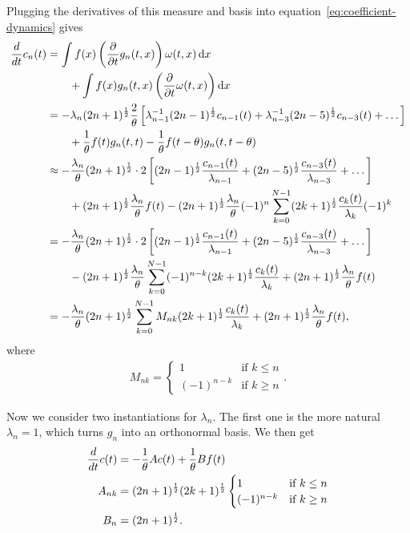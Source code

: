\documentclass[../../hippo]{subfiles}
\begin{document}
Plugging the derivatives of this measure and basis into equation~\eqref{eq:coefficient-dynamics} gives
\begin{align*}
  \frac{d}{dt} c_n(t)
  &= \int f(x) \left(\frac{\partial}{\partial t} g_n(t, x)\right) \omega(t, x) \mathop{}\!\mathrm{d} x
  \\
  &\qquad + \int f(x) g_n(t, x) \left(\frac{\partial}{\partial t} \omega(t, x)\right) \mathop{}\!\mathrm{d} x
  \\
  &= -\lambda_n (2n+1)^{\frac{1}{2}} \frac{2}{\theta} \left[ \lambda_{n-1}^{-1} (2n-1)^{\frac{1}{2}} c_{n-1}(t) + \lambda_{n-3}^{-1} (2n-5)^{\frac{1}{2}} c_{n-3}(t) + \dots \right]
  \\
  &\qquad + \frac{1}{\theta} f(t) g_n(t, t) - \frac{1}{\theta} f(t-\theta) g_n(t, t-\theta)
  \\
  &\approx -\frac{\lambda_n}{\theta} (2n+1)^{\frac{1}{2}} \cdot 2 \left[ (2n-1)^{\frac{1}{2}} \frac{c_{n-1}(t)}{\lambda_{n-1}} + (2n-5)^{\frac{1}{2}} \frac{c_{n-3}(t)}{\lambda_{n-3}} + \dots \right]
  \\
  &\qquad + (2n+1)^{\frac{1}{2}} \frac{\lambda_n}{\theta} f(t)
  - (2n+1)^{\frac{1}{2}} \frac{\lambda_n}{\theta} (-1)^n \sum_{k=0}^{N-1} (2k+1)^{\frac{1}{2}} \frac{c_k(t)}{\lambda_k} (-1)^{k}
  \\
  &= - \frac{\lambda_n}{\theta} (2n+1)^{\frac{1}{2}} \cdot 2 \left[ (2n-1)^{\frac{1}{2}} \frac{c_{n-1}(t)}{\lambda_{n-1}} + (2n-5)^{\frac{1}{2}} \frac{c_{n-3}(t)}{\lambda_{n-3}} + \dots \right]
  \\
  &\qquad - (2n+1)^{\frac{1}{2}} \frac{\lambda_n}{\theta} \sum_{k=0}^{N-1}  (-1)^{n-k} (2k+1)^{\frac{1}{2}} \frac{c_k(t)}{\lambda_{k}}
  + (2n+1)^{\frac{1}{2}} \frac{\lambda_n}{\theta} f(t)
  \\
  &= - \frac{\lambda_n}{\theta} (2n+1)^{\frac{1}{2}} \sum_{k=0}^{N-1}  M_{nk} (2k+1)^{\frac{1}{2}} \frac{c_k(t)}{\lambda_{k}}
  + (2n+1)^{\frac{1}{2}} \frac{\lambda_n}{\theta} f(t)
  ,
\end{align*}
where
\begin{align*}
  M_{nk} = 
  \begin{cases}
    1 & \mbox{if } k \le n \\
    (-1)^{n-k} & \mbox{if } k \ge n
  \end{cases}.
\end{align*}


Now we consider two instantiations for $\lambda_n$.
The first one is the more natural $\lambda_n = 1$, which turns $g_n$ into an orthonormal basis.
We then get
\begin{align*}
  \frac{d}{d t} c(t) &= -\frac{1}{\theta} A c(t) + \frac{1}{\theta} B f(t)
  \\
  A_{nk} &=
  (2n+1)^{\frac{1}{2}}(2k+1)^{\frac{1}{2}}
  \begin{cases}
    1 & \mbox{if } k \le n \\
    (-1)^{n-k} & \mbox{if } k \ge n
  \end{cases}
  \\
  B_n &= (2n+1)^{\frac{1}{2}}
  .
\end{align*}
\end{document}
